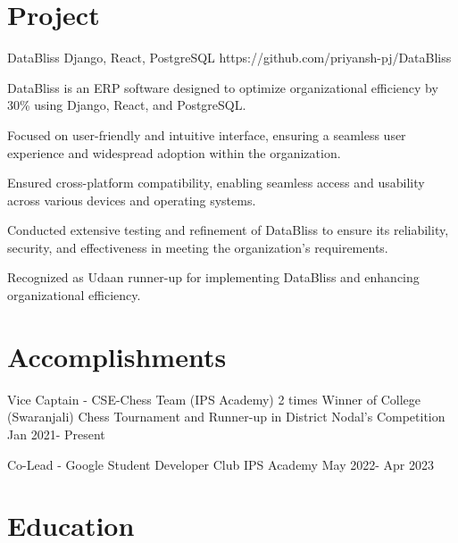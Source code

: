 \documentclass[letterpaper]{config}
\begin{document}
\section{Project}
\Project
    {DataBliss} %
    {Django, React, PostgreSQL} %
    {https://github.com/priyansh-pj/DataBliss}%
    {
        \item DataBliss is an ERP software designed to optimize organizational efficiency by 30\% using Django, React, and PostgreSQL.
        \item Focused on user-friendly and intuitive interface, ensuring a seamless user experience and widespread adoption within the organization.
        \item Ensured cross-platform compatibility, enabling seamless access and usability across various devices and operating systems.
        \item Conducted extensive testing and refinement of DataBliss to ensure its reliability, security, and effectiveness in meeting the organization's requirements.
        \item Recognized as Udaan runner-up for implementing DataBliss and enhancing organizational efficiency.
    }


\section{Accomplishments}


\Responsibility
    {Vice Captain - CSE-Chess Team (IPS Academy)} %
    {2 times Winner of College (Swaranjali) Chess Tournament and Runner-up in District Nodal’s Competition} %
    {Jan 2021- Present} %
    
\Responsibility
    {Co-Lead - Google Student Developer Club} %
    {IPS Academy} %
    {May 2022- Apr 2023} %

    

    
    
    
\section{Education}
\end{document}
